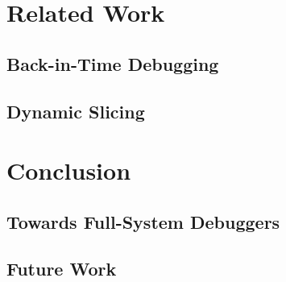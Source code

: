 \chapter{Related Work}
\section{Back-in-Time Debugging}
\section{Dynamic Slicing}

\chapter{Conclusion}
\section{Towards Full-System Debuggers}
\section{Future Work}